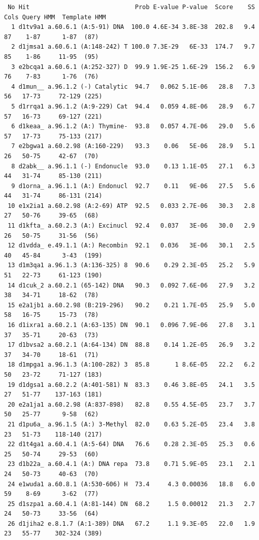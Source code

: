 \documentclass[11pt,a4paper]{article}
\begin{document}
\begin{verbatim}
 No Hit                             Prob E-value P-value  Score    SS Cols Query HMM  Template HMM
  1 d1tv9a1 a.60.6.1 (A:5-91) DNA  100.0 4.6E-34 3.8E-38  202.8   9.4   87    1-87      1-87  (87)
  2 d1jmsa1 a.60.6.1 (A:148-242) T 100.0 7.3E-29   6E-33  174.7   9.7   85    1-86     11-95  (95)
  3 e2bcqa1 a.60.6.1 (A:252-327) D  99.9 1.9E-25 1.6E-29  156.2   6.9   76    7-83      1-76  (76)
  4 d1mun__ a.96.1.2 (-) Catalytic  94.7   0.062 5.1E-06   28.8   7.3   56   17-73     72-129 (225)
  5 d1rrqa1 a.96.1.2 (A:9-229) Cat  94.4   0.059 4.8E-06   28.9   6.7   57   16-73     69-127 (221)
  6 d1keaa_ a.96.1.2 (A:) Thymine-  93.8   0.057 4.7E-06   29.0   5.6   57   17-73     75-133 (217)
  7 e2bgwa1 a.60.2.98 (A:160-229)   93.3    0.06   5E-06   28.9   5.1   26   50-75     42-67  (70)
  8 d2abk__ a.96.1.1 (-) Endonucle  93.0    0.13 1.1E-05   27.1   6.3   44   31-74     85-130 (211)
  9 d1orna_ a.96.1.1 (A:) Endonucl  92.7    0.11   9E-06   27.5   5.6   44   31-74     86-131 (214)
 10 e1x2ia1 a.60.2.98 (A:2-69) ATP  92.5   0.033 2.7E-06   30.3   2.8   27   50-76     39-65  (68)
 11 d1kfta_ a.60.2.3 (A:) Excinucl  92.4   0.037   3E-06   30.0   2.9   26   50-75     31-56  (56)
 12 d1vdda_ e.49.1.1 (A:) Recombin  92.1   0.036   3E-06   30.1   2.5   40   45-84      3-43  (199)
 13 d1m3qa1 a.96.1.3 (A:136-325) 8  90.6    0.29 2.3E-05   25.2   5.9   51   22-73     61-123 (190)
 14 d1cuk_2 a.60.2.1 (65-142) DNA   90.3   0.092 7.6E-06   27.9   3.2   38   34-71     18-62  (78)
 15 e2a1jb1 a.60.2.98 (B:219-296)   90.2    0.21 1.7E-05   25.9   5.0   58   16-75     15-73  (78)
 16 d1ixra1 a.60.2.1 (A:63-135) DN  90.1   0.096 7.9E-06   27.8   3.1   37   35-71     20-63  (73)
 17 d1bvsa2 a.60.2.1 (A:64-134) DN  88.8    0.14 1.2E-05   26.9   3.2   37   34-70     18-61  (71)
 18 d1mpga1 a.96.1.3 (A:100-282) 3  85.8       1 8.6E-05   22.2   6.2   50   23-72     71-127 (183)
 19 d1dgsa1 a.60.2.2 (A:401-581) N  83.3    0.46 3.8E-05   24.1   3.5   27   51-77    137-163 (181)
 20 e2a1ja1 a.60.2.98 (A:837-898)   82.8    0.55 4.5E-05   23.7   3.7   50   25-77      9-58  (62)
 21 d1pu6a_ a.96.1.5 (A:) 3-Methyl  82.0    0.63 5.2E-05   23.4   3.8   23   51-73    118-140 (217)
 22 d1t4ga1 a.60.4.1 (A:5-64) DNA   76.6    0.28 2.3E-05   25.3   0.6   25   50-74     29-53  (60)
 23 d1b22a_ a.60.4.1 (A:) DNA repa  73.8    0.71 5.9E-05   23.1   2.1   24   50-73     40-63  (70)
 24 e1wuda1 a.60.8.1 (A:530-606) H  73.4     4.3 0.00036   18.8   6.0   59    8-69      3-62  (77)
 25 d1szpa1 a.60.4.1 (A:81-144) DN  68.2     1.5 0.00012   21.3   2.7   24   50-73     33-56  (64)
 26 d1jiha2 e.8.1.7 (A:1-389) DNA   67.2     1.1 9.3E-05   22.0   1.9   23   55-77    302-324 (389)

\end{verbatim}
\end{document}
